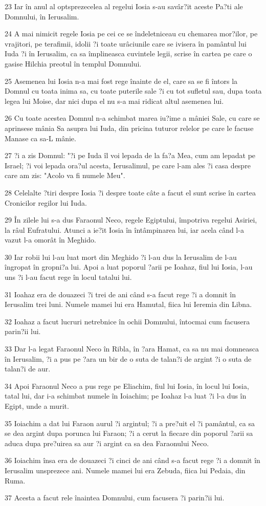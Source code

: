\par 23 Iar în anul al optsprezecelea al regelui Iosia s-au savâr?it aceste Pa?ti ale Domnului, în Ierusalim.
\par 24 A mai nimicit regele Iosia pe cei ce se îndeletniceau cu chemarea mor?ilor, pe vrajitori, pe terafimii, idolii ?i toate urâciunile care se ivisera în pamântul lui Iuda ?i în Ierusalim, ca sa împlineasca cuvintele legii, scrise în cartea pe care o gasise Hilchia preotul în templul Domnului.
\par 25 Asemenea lui Iosia n-a mai fost rege înainte de el, care sa se fi întors la Domnul cu toata inima sa, cu toate puterile sale ?i cu tot sufletul sau, dupa toata legea lui Moise, dar nici dupa el nu s-a mai ridicat altul asemenea lui.
\par 26 Cu toate acestea Domnul n-a schimbat marea iu?ime a mâniei Sale, cu care se aprinsese mânia Sa asupra lui Iuda, din pricina tuturor relelor pe care le facuse Manase ca sa-L mânie.
\par 27 ?i a zis Domnul: "?i pe Iuda îl voi lepada de la fa?a Mea, cum am lepadat pe Israel; ?i voi lepada ora?ul acesta, Ierusalimul, pe care l-am ales ?i casa despre care am zis: "Acolo va fi numele Meu".
\par 28 Celelalte ?tiri despre Iosia ?i despre toate câte a facut el sunt scrise în cartea Cronicilor regilor lui Iuda.
\par 29 În zilele lui s-a dus Faraonul Neco, regele Egiptului, împotriva regelui Asiriei, la râul Eufratului. Atunci a ie?it Iosia în întâmpinarea lui, iar acela când l-a vazut l-a omorât în Meghido.
\par 30 Iar robii lui l-au luat mort din Meghido ?i l-au dus la Ierusalim de l-au îngropat în gropni?a lui. Apoi a luat poporul ?arii pe Ioahaz, fiul lui Iosia, l-au uns ?i l-au facut rege în locul tatalui lui.
\par 31 Ioahaz era de douazeci ?i trei de ani când s-a facut rege ?i a domnit în Ierusalim trei luni. Numele mamei lui era Hamutal, fiica lui Ieremia din Libna.
\par 32 Ioahaz a facut lucruri netrebnice în ochii Domnului, întocmai cum facusera parin?ii lui.
\par 33 Dar l-a legat Faraonul Neco în Ribla, în ?ara Hamat, ca sa nu mai domneasca în Ierusalim, ?i a pus pe ?ara un bir de o suta de talan?i de argint ?i o suta de talan?i de aur.
\par 34 Apoi Faraonul Neco a pus rege pe Eliachim, fiul lui Iosia, în locul lui Iosia, tatal lui, dar i-a schimbat numele în Ioiachim; pe Ioahaz l-a luat ?i l-a dus în Egipt, unde a murit.
\par 35 Ioiachim a dat lui Faraon aurul ?i argintul; ?i a pre?uit el ?i pamântul, ca sa se dea argint dupa porunca lui Faraon; ?i a cerut la fiecare din poporul ?arii sa aduca dupa pre?uirea sa aur ?i argint ca sa dea Faraonului Neco.
\par 36 Ioiachim însa era de douazeci ?i cinci de ani când s-a facut rege ?i a domnit în Ierusalim unsprezece ani. Numele mamei lui era Zebuda, fiica lui Pedaia, din Ruma.
\par 37 Acesta a facut rele înaintea Domnului, cum facusera ?i parin?ii lui.

